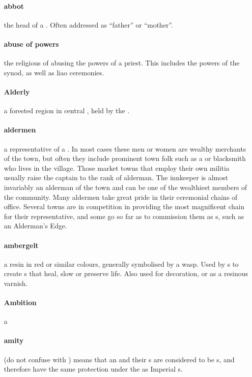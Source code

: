 \paragraph{abbot} the head  of a . Often addressed as “father” or “mother”. 
\paragraph{abuse of powers} the religious  of abusing the powers of a priest. This includes the powers of the synod, as well as liao ceremonies.
\paragraph{Alderly} a forested region in central , held by the .
\paragraph{aldermen} a representative of a . In most cases these men or women are wealthy merchants of the town, but often they include prominent town folk such as a  or blacksmith who lives in the village. Those market towns that employ their own militia usually raise the captain to the rank of alderman. The innkeeper is almost invariably an alderman of the town and can be one of the wealthiest members of the community. Many aldermen take great pride in their ceremonial chains of office. Several towns are in competition in providing the most magnificent chain for their representative, and some go so far as to commission them as s, such as an Alderman's Edge. 
\paragraph{ambergelt} a resin in red or similar colours, generally symbolised by a wasp. Used by s to create s that heal, slow or preserve life. Also used for decoration, or as a resinous varnish.
\paragraph{Ambition} a  
\paragraph{amity} (do not confuse with ) means that an  and their s are considered to be s, and therefore have the same protection under the  as Imperial s.
